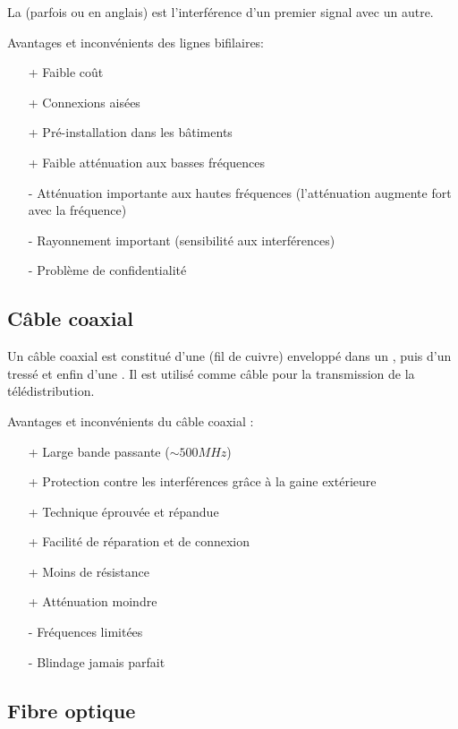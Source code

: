 La  (parfois  ou  en anglais) est l'interférence d'un premier signal avec un autre.

Avantages et inconvénients des lignes bifilaires:
\begin{itemize}
	\item[+] Faible coût
	\item[+] Connexions aisées
	\item[+] Pré-installation dans les bâtiments
	\item[+] Faible atténuation aux basses fréquences
	\item[-] Atténuation importante aux hautes fréquences (l'atténuation augmente fort avec la fréquence)
	\item[-] Rayonnement important (sensibilité aux interférences)
	\item[-] Problème de confidentialité
\end{itemize}

\newpage
\subsection{Câble coaxial}

Un câble coaxial est constitué d'une  (fil de cuivre) enveloppé dans un , puis d'un  tressé et enfin d'une . Il est utilisé comme câble pour la transmission de la télédistribution.

Avantages et inconvénients du câble coaxial :
\begin{itemize}
	\item[+] Large bande passante ($\sim 500 MHz$)
	\item[+] Protection contre les interférences grâce à la gaine extérieure
	\item[+] Technique éprouvée et répandue
	\item[+] Facilité de réparation et de connexion
	\item[+] Moins de résistance
	\item[+] Atténuation moindre
	\item[-] Fréquences limitées
	\item[-] Blindage jamais parfait
\end{itemize}

\subsection{Fibre optique}

